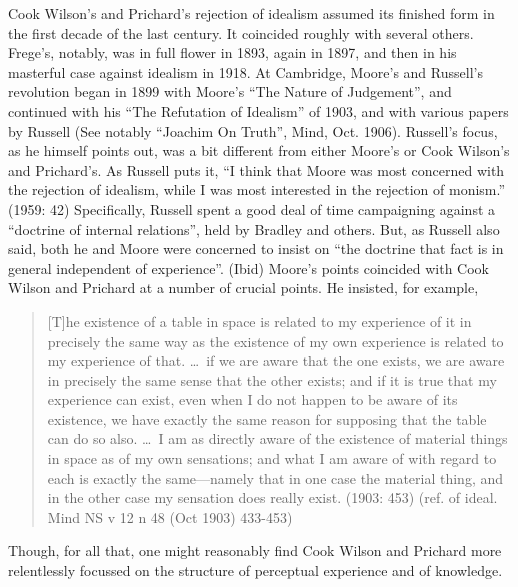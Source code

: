 Cook Wilson’s and Prichard’s rejection of idealism assumed its finished form in the first decade of the last century. It coincided roughly with several others. Frege's, notably, was in full flower in 1893, again in 1897, and then in his masterful case against idealism in 1918. At Cambridge, Moore’s and Russell's revolution began in 1899 with Moore’s ``The Nature of Judgement'', and continued with his ``The Refutation of Idealism'' of 1903, and with various papers by Russell (See notably ``Joachim On Truth'', Mind, Oct. 1906). Russell's focus, as he himself points out, was a bit different from either Moore's or Cook Wilson's and Prichard's. As Russell puts it, ``I think that Moore was most concerned with the rejection of idealism, while I was most interested in the rejection of monism.'' (1959: 42) Specifically, Russell spent a good deal of time campaigning against a ``doctrine of internal relations'', held by Bradley and others. But, as Russell also said, both he and Moore were concerned to insist on ``the doctrine that fact is in general independent of experience''. (Ibid) Moore's points coincided with Cook Wilson and Prichard at a number of crucial points. He insisted, for example, 
\begin{quote}
	[T]he existence of a table in space is related to my experience of it in precisely the same way as the existence of my own experience is related to my experience of that. \ldots\ if we are aware that the one exists, we are aware in precisely the same sense that the other exists; and if it is true that my experience can exist, even when I do not happen to be aware of its existence, we have exactly the same reason for supposing that the table can do so also. \ldots\ I am as directly aware of the existence of material things in space as of my own sensations; and what I am aware of with regard to each is exactly the same---namely that in one case the material thing, and in the other case my sensation does really exist. (1903: 453) (ref. of ideal. Mind NS v 12 n 48 (Oct 1903) 433-453)
\end{quote}
Though, for all that, one might reasonably find Cook Wilson and Prichard more relentlessly focussed on the structure of perceptual experience and of knowledge.

